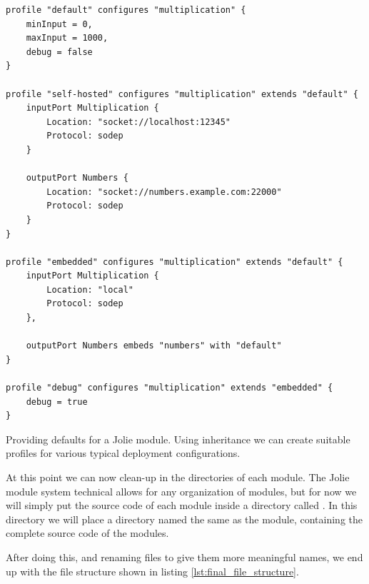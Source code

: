 \begin{listing}[H]
\begin{verbatim}
profile "default" configures "multiplication" {
    minInput = 0,
    maxInput = 1000,
    debug = false
}

profile "self-hosted" configures "multiplication" extends "default" {
    inputPort Multiplication {
        Location: "socket://localhost:12345"
        Protocol: sodep
    }

    outputPort Numbers {
        Location: "socket://numbers.example.com:22000"
        Protocol: sodep
    }
}

profile "embedded" configures "multiplication" extends "default" {
    inputPort Multiplication {
        Location: "local"
        Protocol: sodep
    },

    outputPort Numbers embeds "numbers" with "default"
}

profile "debug" configures "multiplication" extends "embedded" {
    debug = true
}
\end{verbatim}

\caption{Providing defaults for a Jolie module. Using inheritance we can create
suitable profiles for various typical deployment configurations.}

\label{lst:mult_default_config}

\end{listing}

At this point we can now clean-up in the directories of each module. The Jolie
module system technical allows for any organization of modules, but for now we
will simply put the source code of each module inside a directory called
. In this directory we will place a directory named the same as
the module, containing the complete source code of the modules.

After doing this, and renaming files to give them more meaningful names, we end
up with the file structure shown in listing \ref{lst:final_file_structure}.

